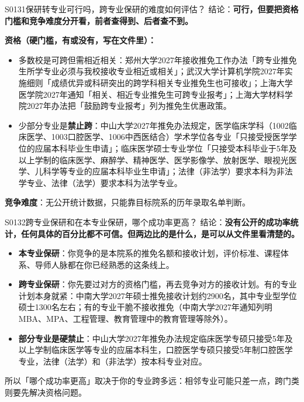 \begin{qa}{S0131}{保研转专业可行吗，跨专业保研的难度如何评估？}
结论：\textbf{可行，但要把资格门槛和竞争难度分开看，前者查得到、后者查不到。}

\textbf{资格（硬门槛，有或没有，写在文件里）：}
\begin{itemize}
  \item 多数校是可跨但需相近相关：郑州大学2027年接收推免工作办法「跨专业推免生所学专业必须与我校接收专业相近或相关」；武汉大学计算机学院2027年实施细则「成绩优异或科研突出的跨学科相关专业推免生也可接收」；上海大学医学院2027年通知「相关、相近专业推免生可跨专业报考」；上海大学材料学院2027年办法把「鼓励跨专业报考」列为推免生优惠政策。
  \item 少部分专业是\textbf{禁止跨}：中山大学2027年推免办法规定，医学临床学科（1002临床医学、1003口腔医学、1006中西医结合）学术学位各专业「只接受授医学学位的应届本科毕业生申请」；临床医学硕士专业学位「只接受本科毕业于5年及以上学制的临床医学、麻醉学、精神医学、医学影像学、放射医学、眼视光医学、儿科学等专业的应届本科毕业生申请」；法律（非法学）要求本科为非法学专业、法律（法学）要求本科为法学专业。
\end{itemize}

\textbf{竞争难度}：无公开统计数据，只能靠目标院系的历年录取名单判断。
\end{qa}

\begin{qa}{S0132}{跨专业保研和在本专业保研，哪个成功率更高？}
结论：\textbf{没有公开的成功率统计，任何具体的百分比都不可信。但两边比的是什么，是可以从文件里看清楚的。}

\begin{itemize}
  \item \textbf{本专业保研}：你竞争的是本院系的推免名额和接收计划，评价标准、课程体系、导师人脉都在你已经熟悉的这条线上。
  \item \textbf{跨专业保研}：你先要过对方的资格门槛，再去竞争对方的接收计划。有的专业计划本身就紧：中南大学2027年硕士推免接收计划约2900名，其中专业型学位硕士1300名左右；有的专业干脆不接收推免（中南大学2027年通知列明MBA、MPA、工程管理、教育管理中的教育管理等除外）。
  \item \textbf{部分专业是硬禁止}：中山大学2027年推免办法规定临床医学专硕只接受5年及以上学制临床医学等专业的应届本科生，口腔医学专硕只接受5年制口腔医学专业，法律（法学）和（非法学）按本科专业对应。
\end{itemize}

所以「哪个成功率更高」取决于你的专业跨多远：相邻专业可能只差一点，跨门类则要先解决资格问题。
\end{qa}

